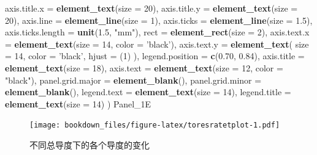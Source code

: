 \documentclass[
]{krantz}
\makeatletter
\newenvironment{Shaded}{\begin{snugshade}}{\end{snugshade}}
\newcommand{\DataTypeTok}[1]{\textcolor[rgb]{0.13,0.29,0.53}{#1}}
\newcommand{\DecValTok}[1]{\textcolor[rgb]{0.00,0.00,0.81}{#1}}
\newcommand{\FloatTok}[1]{\textcolor[rgb]{0.00,0.00,0.81}{#1}}
\newcommand{\KeywordTok}[1]{\textcolor[rgb]{0.13,0.29,0.53}{\textbf{#1}}}
\newcommand{\NormalTok}[1]{#1}
\newcommand{\OperatorTok}[1]{\textcolor[rgb]{0.81,0.36,0.00}{\textbf{#1}}}
\newcommand{\StringTok}[1]{\textcolor[rgb]{0.31,0.60,0.02}{#1}}
\newenvironment{kframe}{%
\medskip{}
\setlength{\fboxsep}{.8em}
 \def\at@end@of@kframe{}%
 \ifinner\ifhmode%
  \def\at@end@of@kframe{\end{minipage}}%
  \begin{minipage}{\columnwidth}%
 \fi\fi%
 \def\FrameCommand##1{\hskip\@totalleftmargin \hskip-\fboxsep
 \colorbox{shadecolor}{##1}\hskip-\fboxsep
     \hskip-\linewidth \hskip-\@totalleftmargin \hskip\columnwidth}%
 \MakeFramed {\advance\hsize-\width
   \@totalleftmargin\z@ \linewidth\hsize
   \@setminipage}}%
 {\par\unskip\endMakeFramed%
 \at@end@of@kframe}
\renewenvironment{Shaded}{\begin{kframe}}{\end{kframe}}
\makeatother
\begin{document}
\begin{Shaded}
\begin{Highlighting}[]
    \DataTypeTok{axis.title.x =} \KeywordTok{element_text}\NormalTok{(}\DataTypeTok{size =} \DecValTok{20}\NormalTok{),}
    \DataTypeTok{axis.title.y =} \KeywordTok{element_text}\NormalTok{(}\DataTypeTok{size =} \DecValTok{20}\NormalTok{),}
    \DataTypeTok{axis.line =} \KeywordTok{element_line}\NormalTok{(}\DataTypeTok{size =} \DecValTok{1}\NormalTok{),}
    \DataTypeTok{axis.ticks =} \KeywordTok{element_line}\NormalTok{(}\DataTypeTok{size =} \FloatTok{1.5}\NormalTok{),}
    \DataTypeTok{axis.ticks.length =} \KeywordTok{unit}\NormalTok{(}\FloatTok{1.5}\NormalTok{, }\StringTok{"mm"}\NormalTok{),}
    \DataTypeTok{rect =} \KeywordTok{element_rect}\NormalTok{(}\DataTypeTok{size =} \DecValTok{2}\NormalTok{),}
    \DataTypeTok{axis.text.x =} \KeywordTok{element_text}\NormalTok{(}\DataTypeTok{size =} \DecValTok{14}\NormalTok{, }\DataTypeTok{color =} \StringTok{'black'}\NormalTok{),}
    \DataTypeTok{axis.text.y =}
      \KeywordTok{element_text}\NormalTok{(}
        \DataTypeTok{size =} \DecValTok{14}\NormalTok{,}
        \DataTypeTok{color =} \StringTok{'black'}\NormalTok{,}
        \DataTypeTok{hjust =}\NormalTok{ (}\DecValTok{1}\NormalTok{)}
\NormalTok{      ),}
    \DataTypeTok{legend.position =} \KeywordTok{c}\NormalTok{(}\FloatTok{0.70}\NormalTok{, }\FloatTok{0.84}\NormalTok{),}
    \DataTypeTok{axis.title =} \KeywordTok{element_text}\NormalTok{(}\DataTypeTok{size =} \DecValTok{18}\NormalTok{),}
    \DataTypeTok{axis.text =} \KeywordTok{element_text}\NormalTok{(}\DataTypeTok{size =} \DecValTok{12}\NormalTok{, }\DataTypeTok{color =} \StringTok{"black"}\NormalTok{),}
    \DataTypeTok{panel.grid.major =} \KeywordTok{element_blank}\NormalTok{(),}
    \DataTypeTok{panel.grid.minor =} \KeywordTok{element_blank}\NormalTok{(),}
    \DataTypeTok{legend.text =} \KeywordTok{element_text}\NormalTok{(}\DataTypeTok{size =} \DecValTok{14}\NormalTok{),}
    \DataTypeTok{legend.title =} \KeywordTok{element_text}\NormalTok{(}\DataTypeTok{size =} \DecValTok{14}\NormalTok{)}
\NormalTok{  )}
\NormalTok{Panel_1E}
\end{Highlighting}
\end{Shaded}

\begin{figure}
\centering
\texttt{[image: bookdown\_files/figure-latex/toresratetplot-1.pdf]}
\caption{\label{fig:toresratetplot}不同总导度下的各个导度的变化}
\end{figure}

\begin{Shaded}
\end{Shaded}
\end{document}
